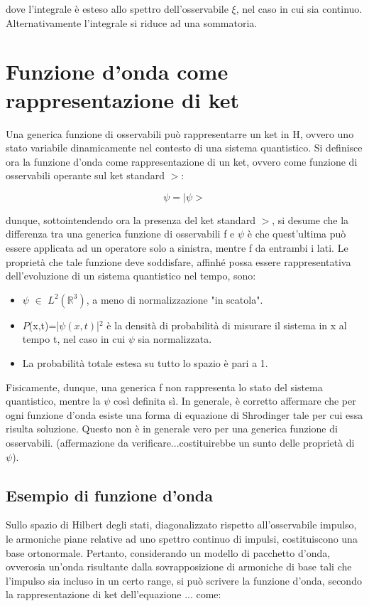 \documentclass{article}
\begin{document}
dove l'integrale è esteso allo spettro dell'osservabile $\xi$, nel caso in cui sia continuo. Alternativamente l'integrale si riduce ad una sommatoria.


\section{Funzione d'onda come rappresentazione di ket}
Una generica funzione di osservabili può rappresentarre un ket in H, ovvero uno stato variabile dinamicamente nel contesto di una sistema quantistico.
Si definisce ora la funzione d'onda come rappresentazione di un ket, ovvero come funzione di osservabili operante sul ket standard $>$:

\begin{equation}
    \psi = |\psi>
\end{equation}

dunque, sottointendendo ora la presenza del ket standard $>$, si desume che la differenza tra una generica funzione di osservabili f e $\psi$ è che
quest'ultima può essere applicata ad un operatore solo a sinistra, mentre f da entrambi i lati.
Le proprietà che tale funzione deve soddisfare, affinhé possa essere rappresentativa dell'evoluzione di un
sistema quantistico nel tempo, sono:

\begin{itemize}
    \item $\psi$ $\in$ $L^2(\mathbb{R}^3)$, a meno di normalizzazione "in scatola".
    \item $P$(x,t)=|$\psi(x,t)$|$^2$ è la densità di probabilità di misurare il sistema in x al tempo t, nel caso in cui $\psi$ sia normalizzata.
    \item La probabilità totale estesa su tutto lo spazio è pari a 1.
\end{itemize}

Fisicamente, dunque, una generica f non rappresenta lo stato del sistema quantistico, mentre la $\psi$ così definita sì.
In generale, è corretto affermare che per ogni funzione d'onda esiste una forma di equazione di Shrodinger tale per cui essa risulta soluzione. Questo non è in generale vero
per una generica funzione di osservabili. (affermazione da verificare...costituirebbe un sunto delle proprietà di $\psi$).


\subsection{Esempio di funzione d'onda}
Sullo spazio di Hilbert degli stati, diagonalizzato rispetto all'osservabile impulso, le armoniche piane relative ad uno spettro continuo di impulsi, costituiscono una base ortonormale.
Pertanto, considerando un modello di pacchetto d'onda, ovverosia un'onda risultante dalla sovrapposizione di armoniche di base tali che l'impulso sia incluso in
un certo range, si può scrivere la funzione d'onda, secondo la rappresentazione di ket dell'equazione ... come:
\end{document}
